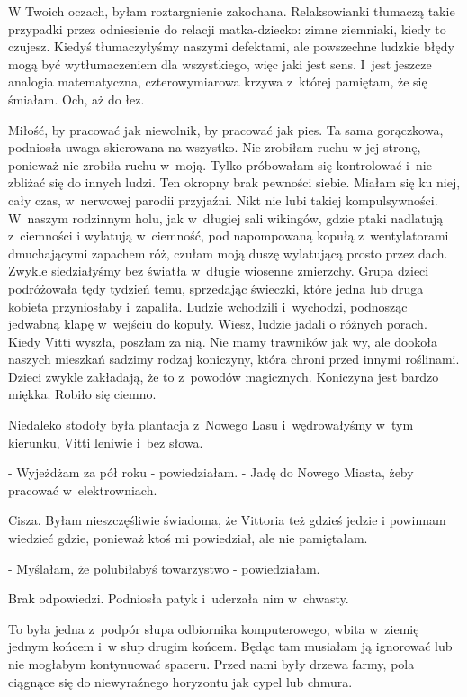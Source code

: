 \documentclass[oneside,polish,12pt,sfheadings]{mwbk}
\begin{document}
W Twoich oczach, byłam roztargnienie zakochana. Relaksowianki tłumaczą
takie przypadki przez odniesienie do relacji matka-dziecko: zimne
ziemniaki, kiedy to czujesz. Kiedyś tłumaczyłyśmy naszymi defektami,
ale powszechne ludzkie błędy mogą być wytłumaczeniem dla wszystkiego,
więc jaki jest sens. I~jest jeszcze analogia matematyczna, czterowymiarowa
krzywa z~której pamiętam, że się śmiałam. Och, aż do łez.

Miłość, by pracować jak niewolnik, by pracować jak pies. Ta sama
gorączkowa, podniosła uwaga skierowana na wszystko. Nie zrobiłam ruchu
w jej stronę, ponieważ nie zrobiła ruchu w~moją. Tylko próbowałam
się kontrolować i~nie zbliżać się do innych ludzi. Ten okropny brak
pewności siebie. Miałam się ku niej, cały czas, w~nerwowej parodii
przyjaźni. Nikt nie lubi takiej kompulsywności. W~naszym rodzinnym
holu, jak w~długiej sali wikingów, gdzie ptaki nadlatują z~ciemności
i wylatują w~ciemność, pod napompowaną kopułą z~wentylatorami dmuchającymi
zapachem róż, czułam moją duszę wylatującą prosto przez dach. Zwykle
siedziałyśmy bez światła w~długie wiosenne zmierzchy. Grupa dzieci
podróżowała tędy tydzień temu, sprzedając świeczki, które jedna lub
druga kobieta przyniosłaby i~zapaliła. Ludzie wchodzili i~wychodzi,
podnosząc jedwabną klapę w~wejściu do kopuły. Wiesz, ludzie jadali
o różnych porach. Kiedy Vitti wyszła, poszłam za nią. Nie mamy trawników
jak wy, ale dookoła naszych mieszkań sadzimy rodzaj koniczyny, która
chroni przed innymi roślinami. Dzieci zwykle zakładają, że to z~powodów
magicznych. Koniczyna jest bardzo miękka. Robiło się ciemno.

Niedaleko stodoły była plantacja z~Nowego Lasu i~wędrowałyśmy w~tym
kierunku, Vitti leniwie i~bez słowa.

- Wyjeżdżam za pół roku - powiedziałam. - Jadę do Nowego Miasta, żeby
pracować w~elektrowniach.

Cisza. Byłam nieszczęśliwie świadoma, że Vittoria też gdzieś jedzie
i powinnam wiedzieć gdzie, ponieważ ktoś mi powiedział, ale nie pamiętałam.

- Myślałam, że polubiłabyś towarzystwo - powiedziałam.

Brak odpowiedzi. Podniosła patyk i~uderzała nim w~chwasty.

To była jedna z~podpór słupa odbiornika komputerowego, wbita w~ziemię
jednym końcem i~w słup drugim końcem. Będąc tam musiałam ją ignorować
lub nie mogłabym kontynuować spaceru. Przed nami były drzewa farmy,
pola ciągnące się do niewyraźnego horyzontu jak cypel lub chmura.
\end{document}
